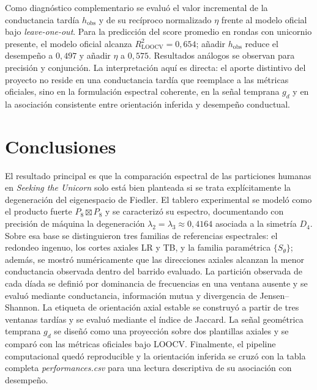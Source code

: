 \documentclass[journal]{IEEEtran}
\begin{document}
Como diagnóstico complementario se evaluó el valor incremental de la conductancia tardía $h_{\mathrm{obs}}$ y de su recíproco normalizado $\eta$ frente al modelo oficial bajo \emph{leave-one-out}. Para la predicción del score promedio en rondas con unicornio presente, el modelo oficial alcanza $R^2_{\mathrm{LOOCV}} = 0{,}654$; añadir $h_{\mathrm{obs}}$ reduce el desempeño a $0{,}497$ y añadir $\eta$ a $0{,}575$. Resultados análogos se observan para precisión y conjunción. La interpretación aquí es directa: el aporte distintivo del proyecto no reside en una conductancia tardía que reemplace a las métricas oficiales, sino en la formulación espectral coherente, en la señal temprana $g_d$ y en la asociación consistente entre orientación inferida y desempeño conductual.

\section{Conclusiones}\label{sec:conclusiones}

El resultado principal es que la comparación espectral de las particiones humanas en \emph{Seeking the Unicorn} solo está bien planteada si se trata explícitamente la degeneración del eigenespacio de Fiedler. El tablero experimental se modeló como el producto fuerte $P_8 \boxtimes P_8$ y se caracterizó su espectro, documentando con precisión de máquina la degeneración $\lambda_2 = \lambda_3 \approx 0{,}4164$ asociada a la simetría $D_4$. Sobre esa base se distinguieron tres familias de referencias espectrales: el redondeo ingenuo, los cortes axiales LR y TB, y la familia paramétrica $\{S_\theta\}$; además, se mostró numéricamente que las direcciones axiales alcanzan la menor conductancia observada dentro del barrido evaluado. La partición observada de cada díada se definió por dominancia de frecuencias en una ventana ausente y se evaluó mediante conductancia, información mutua y divergencia de Jensen--Shannon. La etiqueta de orientación axial estable se construyó a partir de tres ventanas tardías y se evaluó mediante el índice de Jaccard. La señal geométrica temprana $g_d$ se diseñó como una proyección sobre dos plantillas axiales y se comparó con las métricas oficiales bajo LOOCV. Finalmente, el pipeline computacional quedó reproducible y la orientación inferida se cruzó con la tabla completa \emph{performances.csv} para una lectura descriptiva de su asociación con desempeño.
\end{document}
